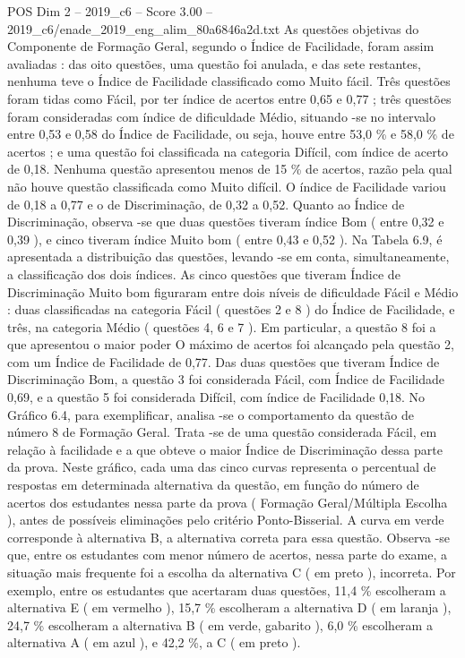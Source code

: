 \begin{textsample}{POS Dim 2 – 2019\_c6 – Score 3.00 – 2019\_c6/enade\_2019\_eng\_alim\_80a6846a2d.txt}
As questões objetivas do Componente de Formação Geral, segundo o Índice de Facilidade, foram assim avaliadas : das oito questões, uma questão foi anulada, e das sete restantes, nenhuma teve o Índice de Facilidade classificado como Muito fácil.
Três questões foram tidas como Fácil, por ter índice de acertos entre 0,65 e 0,77 ; três questões foram consideradas com índice de dificuldade Médio, situando -se no intervalo entre 0,53 e 0,58 do Índice de Facilidade, ou seja, houve entre 53,0 \% e 58,0 \% de acertos ; e uma questão foi classificada na categoria Difícil, com índice de acerto de 0,18.
Nenhuma questão apresentou menos de 15 \% de acertos, razão pela qual não houve questão classificada como Muito difícil.
O índice de Facilidade variou de 0,18 a 0,77 e o de Discriminação, de 0,32 a 0,52.
Quanto ao Índice de Discriminação, observa -se que duas questões tiveram índice Bom ( entre 0,32 e 0,39 ), e cinco tiveram índice Muito bom ( entre 0,43 e 0,52 ).
Na Tabela 6.9, é apresentada a distribuição das questões, levando -se em conta, simultaneamente, a classificação dos dois índices.
As cinco questões que tiveram Índice de Discriminação Muito bom figuraram entre dois níveis de dificuldade Fácil e Médio : duas classificadas na categoria Fácil ( questões 2 e 8 ) do Índice de Facilidade, e três, na categoria Médio ( questões 4, 6 e 7 ).
Em particular, a questão 8 foi a que apresentou o maior poder O máximo de acertos foi alcançado pela questão 2, com um Índice de Facilidade de 0,77.
Das duas questões que tiveram Índice de Discriminação Bom, a questão 3 foi considerada Fácil, com Índice de Facilidade 0,69, e a questão 5 foi considerada Difícil, com índice de Facilidade 0,18.
No Gráfico 6.4, para exemplificar, analisa -se o comportamento da questão de número 8 de Formação Geral.
Trata -se de uma questão considerada Fácil, em relação à facilidade e a que obteve o maior Índice de Discriminação dessa parte da prova.
Neste gráfico, cada uma das cinco curvas representa o percentual de respostas em determinada alternativa da questão, em função do número de acertos dos estudantes nessa parte da prova ( Formação Geral/Múltipla Escolha ), antes de possíveis eliminações pelo critério Ponto-Bisserial.
A curva em verde corresponde à alternativa B, a alternativa correta para essa questão.
Observa -se que, entre os estudantes com menor número de acertos, nessa parte do exame, a situação mais frequente foi a escolha da alternativa C ( em preto ), incorreta.
Por exemplo, entre os estudantes que acertaram duas questões, 11,4 \% escolheram a alternativa E ( em vermelho ), 15,7 \% escolheram a alternativa D ( em laranja ), 24,7 \% escolheram a alternativa B ( em verde, gabarito ), 6,0 \% escolheram a alternativa A ( em azul ), e 42,2 \%, a C ( em preto ).

\end{textsample}
